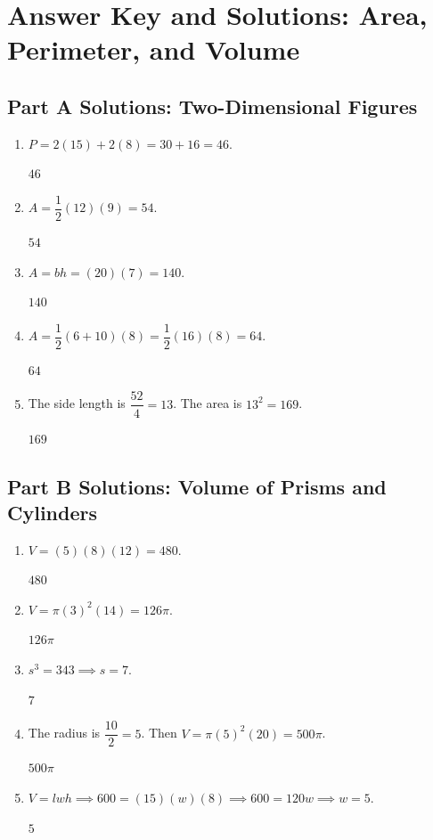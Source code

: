 \documentclass[14pt]{extarticle}
\begin{document}
\newpage

\section*{Answer Key and Solutions: Area, Perimeter, and Volume}

\subsection*{Part A Solutions: Two-Dimensional Figures}
\begin{enumerate}
  \item \(P = 2(15) + 2(8) = 30 + 16 = 46\).

  \(\boxed{46}\)

  \item \(A = \dfrac{1}{2}(12)(9) = 54\).

  \(\boxed{54}\)

  \item \(A = bh = (20)(7) = 140\).

  \(\boxed{140}\)

  \item \(A = \dfrac{1}{2}(6 + 10)(8) = \dfrac{1}{2}(16)(8) = 64\).

  \(\boxed{64}\)

  \item The side length is \(\dfrac{52}{4} = 13\). The area is \(13^2 = 169\).

  \(\boxed{169}\)
\end{enumerate}

\subsection*{Part B Solutions: Volume of Prisms and Cylinders}
\begin{enumerate}
  \item \(V = (5)(8)(12) = 480\).

  \(\boxed{480}\)

  \item \(V = \pi(3)^2(14) = 126\pi\).

  \(\boxed{126\pi}\)

  \item \(s^3 = 343 \implies s = 7\).

  \(\boxed{7}\)

  \item The radius is \(\dfrac{10}{2} = 5\). Then \(V = \pi(5)^2(20) = 500\pi\).

  \(\boxed{500\pi}\)

  \item \(V = lwh \implies 600 = (15)(w)(8) \implies 600 = 120w \implies w = 5\).

  \(\boxed{5}\)
\end{enumerate}
\end{document}
